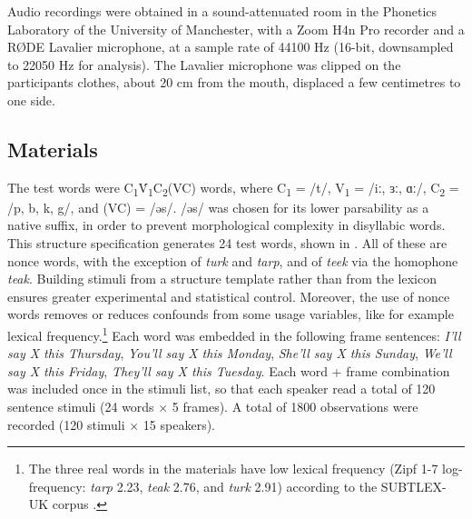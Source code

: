 \documentclass[12pt,a4paper,]{article}
\begin{document}
Audio recordings were obtained in a sound-attenuated room in the
Phonetics Laboratory of the University of Manchester, with a Zoom H4n
Pro recorder and a RØDE Lavalier microphone, at a sample rate of 44100
Hz (16-bit, downsampled to 22050 Hz for analysis). The Lavalier
microphone was clipped on the participants clothes, about 20 cm from the
mouth, displaced a few centimetres to one side.

\hypertarget{materials}{%
\subsection{Materials}\label{materials}}


The test words were
C\textsubscript{1}V́\textsubscript{1}C\textsubscript{2}(VC) words, where
C\textsubscript{1} = /t/, V\textsubscript{1} = /iː, ɜː, ɑː/,
C\textsubscript{2} = /p, b, k, g/, and (VC) = /əs/. /əs/ was chosen for
its lower parsability as a native suffix, in order to prevent
morphological complexity in disyllabic words. This structure
specification generates 24 test words, shown in . All of
these are nonce words, with the exception of \emph{turk} and
\emph{tarp}, and of \emph{teek} via the homophone \emph{teak}. Building
stimuli from a structure template rather than from the lexicon ensures
greater experimental and statistical control. Moreover, the use of nonce
words removes or reduces confounds from some usage variables, like for
example lexical
frequency.\footnote{The three real words in the materials have low lexical frequency (Zipf 1-7 log-frequency: \textit{tarp} 2.23, \textit{teak} 2.76, and \textit{turk} 2.91) according to the SUBTLEX-UK corpus \citep{van-heuven2014}.}
Each word was embedded in the following frame sentences: \emph{I'll say
X this Thursday}, \emph{You'll say X this Monday}, \emph{She'll say X
this Sunday}, \emph{We'll say X this Friday}, \emph{They'll say X this
Tuesday}. Each word + frame combination was included once in the stimuli
list, so that each speaker read a total of 120 sentence stimuli (24
words × 5 frames). A total of 1800 observations were recorded (120
stimuli × 15 speakers).
\end{document}
